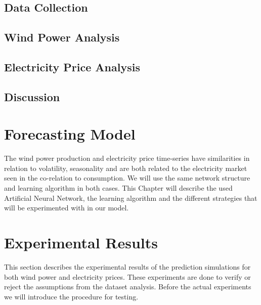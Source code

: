 \documentclass[twoside,11pt,openright]{report}
\begin{document}
\section{Data Collection}
\label{sec:dataCollection}

\newpage
\section{Wind Power Analysis}
\label{sec:windPowerAnalysis}

\newpage
\section{Electricity Price Analysis}
\label{sec:ElectricityPriceAnalysis}

\section{Discussion}



\chapter{Forecasting Model}
\label{ch:forecastingModel}
The wind power production and electricity price time-series have similarities in relation to volatility, seasonality and are both related to the electricity market seen in the co-relation to consumption. We will use the same network structure and learning algorithm in both cases. This Chapter will describe the used Artificial Neural Network, the learning algorithm and the different strategies that will be experimented with in our model.







\chapter{Experimental Results}
\label{ch:experimentalResults}
This section describes the experimental results of the prediction simulations for both wind power and electricity prices. These experiments are done to verify or reject the assumptions from the dataset analysis. Before the actual experiments we will introduce the procedure for testing.
\end{document}
